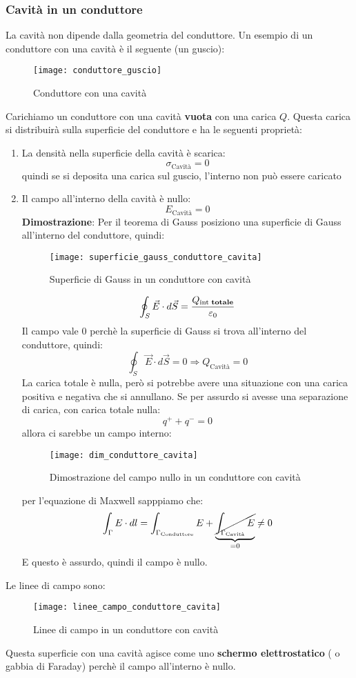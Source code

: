 \documentclass[a4paper]{article}
\begin{document}
\subsubsection{Cavità in un conduttore}
La cavità non dipende dalla geometria del conduttore. Un esempio di un conduttore con
una cavità è il seguente (un guscio):
\begin{figure}[H]
  \centering
  \texttt{[image: conduttore\_guscio]}
  \caption{Conduttore con una cavità}
\end{figure}

\noindent
Carichiamo un conduttore con una cavità \textbf{vuota} con una carica \( Q \). Questa carica
si distribuirà sulla superficie del conduttore e ha le seguenti proprietà:
\begin{enumerate}
  \item La densità nella superficie della cavità è scarica:
    \[
      \sigma_{\text{Cavità}} = 0
    \] 
    quindi se si deposita una carica sul guscio, l'interno non può essere caricato
    
  \item Il campo all'interno della cavità è nullo:
    \[
      E_{\text{Cavità}} = 0
    \] 
    \textbf{Dimostrazione}: Per il teorema di Gauss posiziono una superficie di Gauss
    all'interno del conduttore, quindi:
    \begin{figure}[H]
      \centering
      \texttt{[image: superficie\_gauss\_conduttore\_cavita]}
      \caption{Superficie di Gauss in un conduttore con cavità}
    \end{figure}
    \[
      \oint_S \vec{E} \cdot d\vec{S} = \frac{Q_{\text{int \textbf{totale}}}}{\varepsilon_0}
    \] 
    Il campo vale 0 perchè la superficie di Gauss si trova all'interno del conduttore,
    quindi:
    \[
      \oint_S \vec{E} \cdot d\vec{S} = 0 \Rightarrow Q_{\text{Cavità}} = 0
    \] 
    La carica totale è nulla, però si potrebbe avere una situazione con una carica positiva
    e negativa che si annullano. Se per assurdo si avesse una separazione di carica,
    con carica totale nulla:
    \[
      q^+ + q^- = 0
    \] 
    allora ci sarebbe un campo interno:
    \begin{figure}[H]
      \centering
      \texttt{[image: dim\_conduttore\_cavita]}
      \caption{Dimostrazione del campo nullo in un conduttore con cavità}
    \end{figure}
    per l'equazione di Maxwell sapppiamo che:
    \[
      \int_\Gamma E \cdot dl = \int_{\Gamma_{\text{Conduttore}}} E +
      \underbrace{\cancel{\int_{\Gamma_{\text{Cavità}}} E}}_{=0} \neq 0
    \] 
    E questo è assurdo, quindi il campo è nullo.
\end{enumerate}
Le linee di campo sono:
\begin{figure}[H]
  \centering
  \texttt{[image: linee\_campo\_conduttore\_cavita]}
  \caption{Linee di campo in un conduttore con cavità}
\end{figure}
\noindent
Questa superficie con una cavità agisce come uno \textbf{schermo elettrostatico} (
o gabbia di Faraday) perchè il campo all'interno è nullo. 
\end{document}
